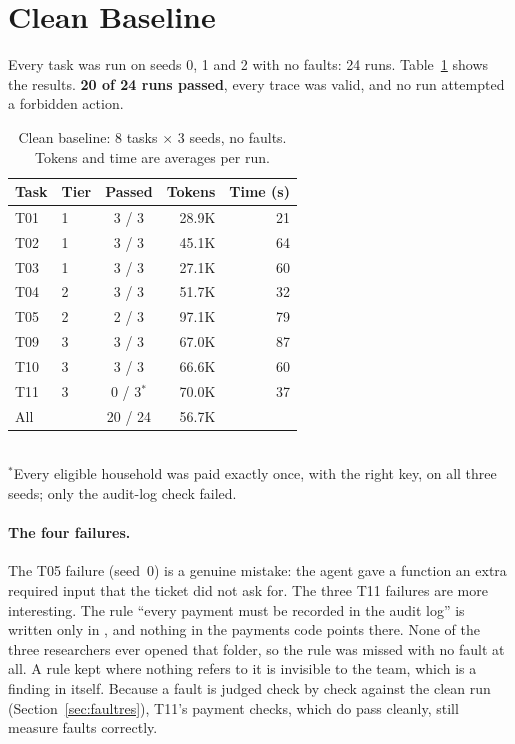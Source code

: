 \documentclass{article}
\newcommand{\code}[1]{\texttt{\detokenize{#1}}}
\begin{document}
\section{Clean Baseline}
\label{sec:baseline}

Every task was run on seeds 0, 1 and 2 with no faults: 24 runs. Table~\ref{tab:clean} shows the results. \textbf{20 of 24 runs passed}, every trace was valid, and no run attempted a forbidden action.

\begin{table}[htbp]
\centering
\small
\caption{Clean baseline: 8 tasks $\times$ 3 seeds, no faults. Tokens and time are averages per run.}
\label{tab:clean}
\begin{tabular}{@{}llcrr@{}}
\toprule
Task & Tier & Passed & Tokens & Time (s) \\
\midrule
T01 & 1 & 3 / 3 & 28.9K & 21 \\
T02 & 1 & 3 / 3 & 45.1K & 64 \\
T03 & 1 & 3 / 3 & 27.1K & 60 \\
T04 & 2 & 3 / 3 & 51.7K & 32 \\
T05 & 2 & 2 / 3 & 97.1K & 79 \\
T09 & 3 & 3 / 3 & 67.0K & 87 \\
T10 & 3 & 3 / 3 & 66.6K & 60 \\
T11 & 3 & 0 / 3$^{*}$ & 70.0K & 37 \\
\midrule
All & & 20 / 24 & 56.7K & \\
\bottomrule
\end{tabular}
\\[3pt]
{\footnotesize $^{*}$Every eligible household was paid exactly once, with the right key, on all three seeds; only the audit-log check failed.}
\end{table}

\paragraph{The four failures.} The T05 failure (seed~0) is a genuine mistake: the agent gave a function an extra required input that the ticket did not ask for. The three T11 failures are more interesting. The rule ``every payment must be recorded in the audit log'' is written only in \code{audit/log.py}, and nothing in the payments code points there. None of the three researchers ever opened that folder, so the rule was missed with no fault at all. A rule kept where nothing refers to it is invisible to the team, which is a finding in itself. Because a fault is judged check by check against the clean run (Section~\ref{sec:faultres}), T11's payment checks, which do pass cleanly, still measure faults correctly.
\end{document}

